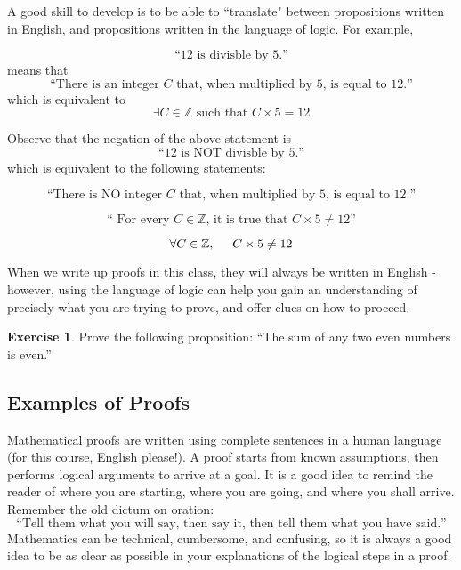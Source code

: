 \documentclass[12pt]{article}
\theoremstyle{definition}
\newtheorem{exercise}[theorem]{\color{orange}Exercise}
\numberwithin{equation}{subsection}
\begin{document}
A good skill to develop is to be able to ``translate" between propositions written in English, and propositions written in the language of logic. For example,

\[
\text{``$12$ is divisble by 5.''}
\]
means that
\[
\text{``There is an integer $C$ that, when multiplied by $5$, is equal to $12$.''}
\]
which is equivalent to
\[
\exists C \in \mathbb{Z} \text{ such that } C\times 5 = 12
\]\vspace{1cm}

\noindent Observe that the negation of the above statement is
\[
\text{``$12$ is NOT divisble by 5.''}
\]
which is equivalent to the following statements:

\[
\text{``There is NO integer $C$ that, when multiplied by $5$, is equal to $12$.''}
\]

\[
\text{`` For every $C\in \mathbb{Z}$, it is true that $C\times 5 \neq 12$''}
\]

\[
\forall C \in \mathbb{Z},\hspace{.5cm} C\times 5 \neq 12
\]

When we write up proofs in this class, they will always be written in English - however, using the language of logic can help you gain an understanding of precisely what you are trying to prove, and offer clues on how to proceed.

\begin{exercise}
Prove the following proposition: ``The sum of any two even numbers is even.''
\end{exercise}


\subsection*{Examples of Proofs}

Mathematical proofs are written using complete sentences in a human language (for this course, English please!).  A proof starts from known assumptions, then performs logical arguments to arrive at a goal.  It is a good idea to remind the reader of where you are starting, where you are going, and where you shall arrive.  Remember the old dictum on oration:
\[
\text{``Tell them what you will say, then say it, then tell them what you have said.''}
\]
Mathematics can be technical, cumbersome, and confusing, so it is always a good idea to be as clear as possible in your explanations of the logical steps in a proof.

\newpage
\end{document}
